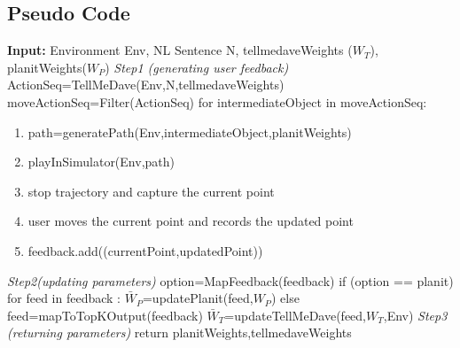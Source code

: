 \subsection{Pseudo Code}
\textbf{Input:} Environment Env, NL Sentence N, tellmedaveWeights ($W_{T}$), planitWeights($W_{P}$)
\newline \newline
\textit{Step1 (generating user feedback)} \newline \newline
ActionSeq=TellMeDave(Env,N,tellmedaveWeights)  
moveActionSeq=Filter(ActionSeq)  \newline  \newline
for intermediateObject in moveActionSeq:
\begin{enumerate}
\item path=generatePath(Env,intermediateObject,planitWeights)
\item playInSimulator(Env,path)
\item stop trajectory and capture the current point
\item user moves the current point and records the updated point
\item feedback.add((currentPoint,updatedPoint))
\end{enumerate}
\textit{Step2(updating parameters)} \newline \newline
option=MapFeedback(feedback) \newline
if (option == planit) \newline
\hphantom {1} \hphantom {1} for feed in feedback : \newline
\hphantom {1} \hphantom {1} \hphantom {1} $\bar{W}_{P}$=updatePlanit(feed,$W_{P}$) \newline
else \newline
\hphantom {1} \hphantom {1}feed=mapToTopKOutput(feedback) \newline
\hphantom {1} \hphantom {1}$\bar{W}_{T}$=updateTellMeDave(feed,$W_{T}$,Env) \newline
\newline
\textit{Step3 (returning parameters)} \newline 
return planitWeights,tellmedaveWeights \newline